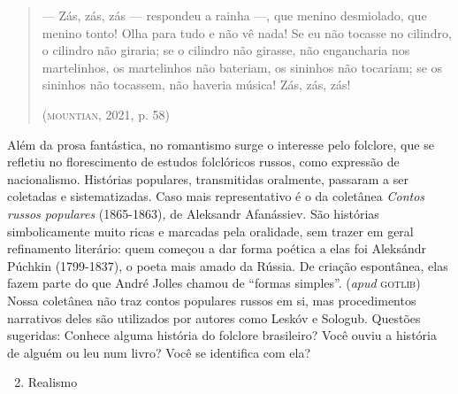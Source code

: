 \documentclass[11pt]{extarticle}
\begin{document}
\begin{quote}
--- Zás, zás, zás --- respondeu a rainha ---, que menino desmiolado, que
menino tonto! Olha para tudo e não vê nada! Se eu não tocasse no
cilindro, o cilindro não giraria; se o cilindro não girasse, não
engancharia nos martelinhos, os martelinhos não bateriam, os sininhos
não tocariam; se os sininhos não tocassem, não haveria música! Zás, zás,
zás!

(\textsc{mountian}, 2021, p. 58)
\end{quote}


Além da prosa fantástica, no romantismo surge o interesse pelo
folclore, que se refletiu no florescimento de estudos folclóricos
russos, como expressão de nacionalismo. Histórias populares,
transmitidas oralmente, passaram a ser coletadas e sistematizadas. Caso
mais representativo é o da coletânea \emph{Contos russos populares}
(1865-1863)\emph{,} de Aleksandr Afanássiev. São histórias
simbolicamente muito ricas e marcadas pela oralidade, sem trazer em
geral refinamento literário: quem começou a dar forma poética a elas foi
Aleksándr Púchkin (1799-1837), o poeta mais amado da Rússia. De criação
espontânea, elas fazem parte do que André Jolles chamou de ``formas
simples''. (\emph{apud} \textsc{gotlib}) Nossa coletânea não traz contos
populares russos em si, mas procedimentos narrativos deles são
utilizados por autores como Leskóv e Sologub. Questões sugeridas:
Conhece alguma história do folclore brasileiro? Você ouviu a história de
alguém ou leu num livro? Você se identifica com ela?

\begin{enumerate}
\setcounter{enumi}{1}
\item Realismo
\end{enumerate}

\end{document}
